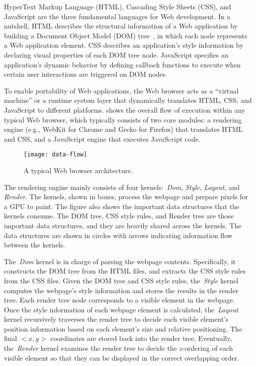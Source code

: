 HyperText Markup Language (HTML), Cascading Style Sheets (CSS), and JavaScript are the three fundamental languages for Web development. In a nutshell, HTML describes the structural information of a Web application by building a Document Object Model (DOM) tree~\cite{DOM}, in which each node represents a Web application element. CSS describes an application's style information by declaring visual properties of each DOM tree node. JavaScript specifies an application's dynamic behavior by defining callback functions to execute when certain user interactions are triggered on DOM nodes.

To enable portability of Web applications, the Web browser acts as a ``virtual machine'' or a runtime system layer that dynamically translates HTML, CSS, and JavaScript to different platforms.  shows the overall flow of execution within any typical Web browser, which typically consists of two core modules: a rendering engine (e.g., WebKit for Chrome and Gecko for Firefox) that translates HTML and CSS, and a JavaScript engine that executes JavaScript code.

\begin{figure}[t]
\centering
\texttt{[image: data-flow]}
\caption{A typical Web browser architecture.}
\label{fig:data-flow}
\end{figure}

The rendering engine mainly consists of four kernels:~\textit{Dom}, \textit{Style}, \textit{Layout}, and \textit{Render}. The kernels, shown in boxes, process the webpage and prepare pixels for a GPU to paint. The figure also shows the important data structures that the kernels consume. The DOM tree, CSS style rules, and Render tree are those important data structures, and they are heavily shared across the kernels. The data structures are shown in circles with arrows indicating information flow between the kernels. 

The~\textit{Dom} kernel is in charge of parsing the webpage contents. Specifically, it constructs the DOM tree from the HTML files, and extracts the CSS style rules from the CSS files. Given the DOM tree and CSS style rules, the~\textit{Style} kernel computes the webpage's style information and stores the results in the render tree. Each render tree node corresponds to a visible element in the webpage. Once the style information of each webpage element is calculated, the~\textit{Layout} kernel recursively traverses the render tree to decide each visible element's position information based on each element's size and relative positioning. The final $<x, y>$ coordinates are stored back into the render tree. Eventually, the~\textit{Render} kernel examines the render tree to decide the $z$-ordering of each visible element so that they can be displayed in the correct overlapping order.

